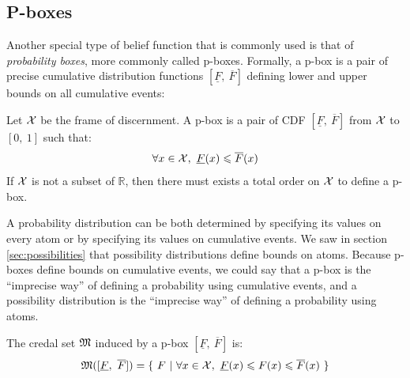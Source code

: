 \subsection{P-boxes}\label{sec:pboxes}
Another special type of belief function that is commonly used is that of \textit{probability boxes}, more commonly called p-boxes. Formally, a p-box is a pair of precise cumulative distribution functions $[\underline{F}, ~\overline{F}]$ defining lower and upper bounds on all cumulative events:

\begin{definition}[P-box]\label{def:p-box}
    Let ${\mathcal{X}}$ be the frame of discernment. A p-box is a pair of CDF $[\underline{F}, ~\overline{F}]$ from ${\mathcal{X}}$ to $[0, ~1]$ such that:
    \begin{equation}
    	\forall x \in {\mathcal{X}},~\underline{F}(x) \leqslant \overline{F}(x) \label{eq:p-box}
    \end{equation}
    If ${\mathcal{X}}$ is not a subset of $\mathbb{R}$, then there must exists a total order on ${\mathcal{X}}$ to define a p-box. 
\end{definition}

\begin{remark}
    A probability distribution can be both determined by specifying its values on every atom or by specifying its values on cumulative events. We saw in section \ref{sec:possibilities} that possibility distributions define bounds on atoms. Because p-boxes define bounds on cumulative events, we could say that a p-box is the ``imprecise way'' of defining a probability using cumulative events, and a possibility distribution is the ``imprecise way'' of defining a probability using atoms.
\end{remark}

The credal set ${\mathfrak{M}}$ induced by a p-box $[\underline{F}, ~\overline{F}]$ is:
\begin{align}
    {\mathfrak{M}}([\underline{F}, ~\overline{F}]) = \{~ F ~|~ \forall x\in{\mathcal{X}}, ~\underline{F}(x)\leqslant F(x)\leqslant \overline{F}(x) ~\}
\end{align}

